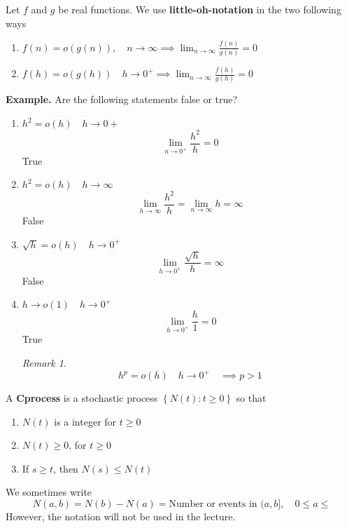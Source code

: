 \documentclass{article}
\theoremstyle{remark}
\newtheorem*{remark}{Remark}
\begin{document}
\begin{definition}
  Let $f$ and $g$ be real functions. We use \textbf{little-oh-notation}  in the two following ways 
  \begin{enumerate}[label=(\roman*)]
    \item $\displaystyle f\left( n \right) = o\left( g\left( n \right) \right) , \quad  n\to \infty \implies  \lim_{n\to \infty} \frac{f\left( n \right)}{g\left( n \right) }  = 0 $ 
    \item $\displaystyle f\left( h \right) = o\left( g\left( h \right) \right) \quad h\to 0^{+} \implies  \lim_{ n\to \infty } \frac{f\left( h \right)}{ g\left( h \right)} = 0    $
  \end{enumerate}
\end{definition}

\begin{tcolorbox}
  \textbf{Example.} Are the following statements false or true? 
  \begin{enumerate}[label=(\roman*)]
    \item $h^2 = o\left( h \right) \quad  h\to  0  + $ \[
    \lim_{n\to  0^{+}}  \frac{h^2}{h} = 0
    \] 
    True
    \item $h^2 = o\left( h \right) \quad  h \to  \infty $ \[
        \lim_{h \to  \infty}  \frac{h^2}{h} = \lim_{n \to \infty} h = \infty
    \] 
    False
    \item $\sqrt{h}  = o\left( h \right) \quad  h\to  0^{+} $ \[
    \lim_{h \to 0^{+}}  \frac{\sqrt{h} }{h}  = \infty
    \] 
    False
    \item $h\to  o\left( 1 \right)\quad h\to 0^{+} $ \[
    \lim_{h \to 0^{+}}  \frac{h}{1 }  = 0
    \] 
    True

    \begin{remark}
      \[
      h^{p} = o\left( h \right) \quad h \to 0^{+}\quad \implies p >1  
      \] 
    \end{remark}
  \end{enumerate}
\end{tcolorbox}

\begin{definition}
  A \textbf{C\inftunting process}  is a stochastic process $\left\{ N\left( t \right) : t \ge 0 \right\}$ so that 
  \begin{enumerate}[label=(\roman*)]
    \item $N\left(  t \right)$ is a integer for $t\ge 0$
    \item $N\left( t \right) \ge 0$, for $t\ge0$
    \item If $s \ge t$, then $N\left( s \right) \le N\left( t \right)$
  \end{enumerate}
  We sometimes write \[
    N\left( a,b \right) = N\left( b \right) - N\left( a \right) = \text{Number or events in } (a,b] , \quad   0\le a \le 
  \] 
  However, the notation will not be used in the lecture. 
\end{definition}
\end{document}
